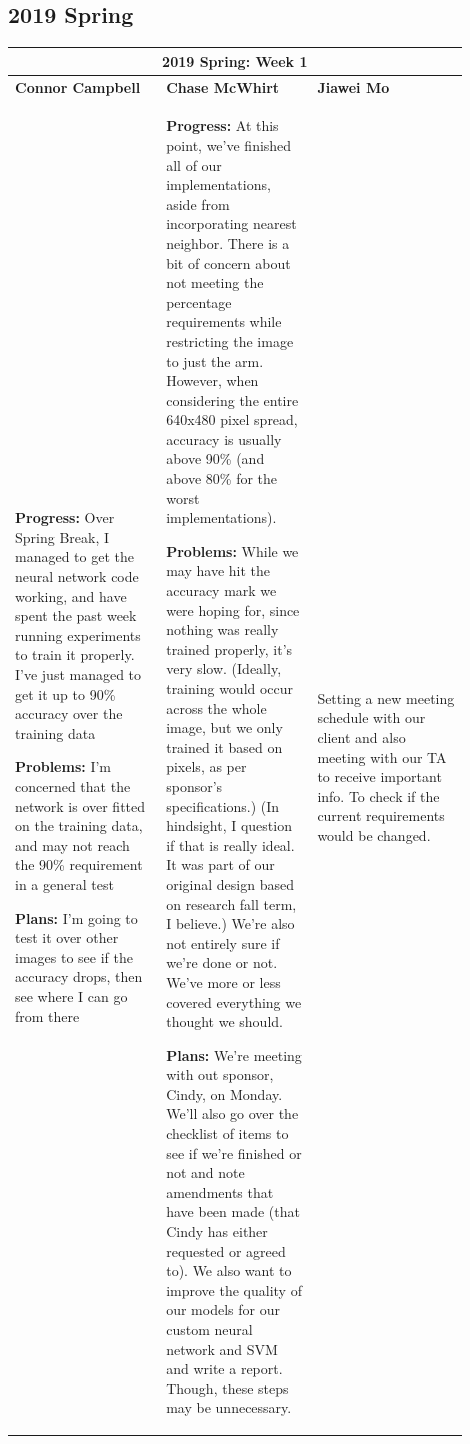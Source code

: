 \documentclass[10pt,journal,compsoc, draftclsnofoot,onecolumn]{IEEEtran}
\begin{document}
\subsection{2019 Spring}
\begin{center}
\begin{tabular}{|p{0.3\linewidth}|p{0.3\linewidth}|p{0.3\linewidth}|}
\hline
\multicolumn{3}{|c|}{\textbf{2019 Spring: Week 1}} \\
\hline
\textbf{Connor Campbell} & \textbf{Chase McWhirt} & \textbf{Jiawei Mo} \\ [0.5ex]
\hline\hline

\textbf{Progress:} Over Spring Break, I managed to get the neural network code working, and have spent the past week running experiments to train it properly. I've just managed to get it up to 90\% accuracy over the training data

\textbf{Problems:} I'm concerned that the network is over fitted on the training data, and may not reach the 90\% requirement in a general test

\textbf{Plans:} I'm going to test it over other images to see if the accuracy drops, then see where I can go from there
&
\textbf{Progress:} At this point, we've finished all of our implementations, aside from incorporating nearest neighbor.
There is a bit of concern about not meeting the percentage requirements while restricting the image to just the arm.
However, when considering the entire 640x480 pixel spread, accuracy is usually above 90\% (and above 80\% for the worst implementations).

\textbf{Problems:} While we may have hit the accuracy mark we were hoping for, since nothing was really trained properly, it's very slow.
(Ideally, training would occur across the whole image, but we only trained it based on pixels, as per sponsor's specifications.)
(In hindsight, I question if that is really ideal.
It was part of our original design based on research fall term, I believe.)
We're also not entirely sure if we're done or not.
We've more or less covered everything we thought we should.

\textbf{Plans:} We're meeting with out sponsor, Cindy, on Monday.
We'll also go over the checklist of items to see if we're finished or not and note amendments that have been made (that Cindy has either requested or agreed to).
We also want to improve the quality of our models for our custom neural network and SVM and write a report.
Though, these steps may be unnecessary.
&
Setting a new meeting schedule with our client and also meeting with our TA to receive important info. To check if the current requirements would be changed.
\\ \hline
\end{tabular}
\end{center}
\end{document}

